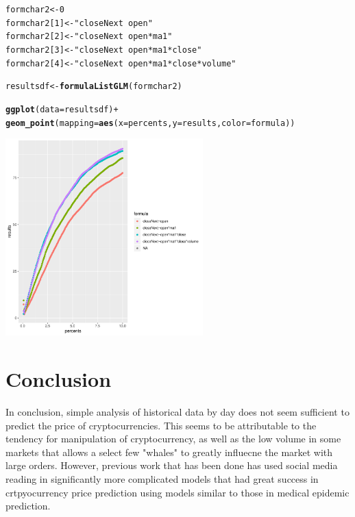 \documentclass{article}\usepackage[]{graphicx}\usepackage[]{color}
\makeatletter
\newcommand{\hlnum}[1]{\textcolor[rgb]{0.686,0.059,0.569}{#1}}%
\newcommand{\hlstr}[1]{\textcolor[rgb]{0.192,0.494,0.8}{#1}}%
\newcommand{\hlopt}[1]{\textcolor[rgb]{0,0,0}{#1}}%
\newcommand{\hlstd}[1]{\textcolor[rgb]{0.345,0.345,0.345}{#1}}%
\newcommand{\hlkwb}[1]{\textcolor[rgb]{0.69,0.353,0.396}{#1}}%
\newcommand{\hlkwc}[1]{\textcolor[rgb]{0.333,0.667,0.333}{#1}}%
\newcommand{\hlkwd}[1]{\textcolor[rgb]{0.737,0.353,0.396}{\textbf{#1}}}%
\newenvironment{kframe}{%
 \def\at@end@of@kframe{}%
 \ifinner\ifhmode%
  \def\at@end@of@kframe{\end{minipage}}%
  \begin{minipage}{\columnwidth}%
 \fi\fi%
 \def\FrameCommand##1{\hskip\@totalleftmargin \hskip-\fboxsep
 \colorbox{shadecolor}{##1}\hskip-\fboxsep
     \hskip-\linewidth \hskip-\@totalleftmargin \hskip\columnwidth}%
 \MakeFramed {\advance\hsize-\width
   \@totalleftmargin\z@ \linewidth\hsize
   \@setminipage}}%
 {\par\unskip\endMakeFramed%
 \at@end@of@kframe}
\newenvironment{knitrout}{}{} %
\makeatother
\begin{document}
\begin{knitrout}
\color{fgcolor}\begin{kframe}
\begin{alltt}
  \hlstd{formchar2}    \hlkwb{<-} \hlnum{0}
  \hlstd{formchar2[}\hlnum{1}\hlstd{]} \hlkwb{<-} \hlstr{"closeNext~open"}
  \hlstd{formchar2[}\hlnum{2}\hlstd{]} \hlkwb{<-} \hlstr{"closeNext~open*ma1"}
  \hlstd{formchar2[}\hlnum{3}\hlstd{]} \hlkwb{<-} \hlstr{"closeNext~open*ma1*close"}
  \hlstd{formchar2[}\hlnum{4}\hlstd{]} \hlkwb{<-} \hlstr{"closeNext~open*ma1*close*volume"}

  \hlstd{resultsdf} \hlkwb{<-} \hlkwd{formulaListGLM}\hlstd{(formchar2)}
\end{alltt}
\end{kframe}
\end{knitrout}

\begin{center}
\begin{knitrout}
\color{fgcolor}\begin{kframe}
\begin{alltt}
\hlkwd{ggplot}\hlstd{(}\hlkwc{data}\hlstd{=resultsdf)} \hlopt{+}
  \hlkwd{geom_point}\hlstd{(}\hlkwc{mapping} \hlstd{=} \hlkwd{aes}\hlstd{(}\hlkwc{x}\hlstd{=percents,}\hlkwc{y}\hlstd{=results,}\hlkwc{color}\hlstd{=formula))}
\end{alltt}
\end{kframe}
\includegraphics[width=3in,height=3in]{figure/unnamed-chunk-19-1} 

\end{knitrout}
\end{center}

\section{Conclusion}
In conclusion, simple analysis of historical data by day does not seem sufficient to predict the price of cryptocurrencies. This seems to be attributable to the tendency for manipulation of cryptocurrency, as well as the low volume in some markets that allows a select few "whales" to greatly influecne the market with large orders.\cite{liu2018risks} However, previous work that has been done has used social media reading in significantly more complicated models that had great success in crtpyocurrency price prediction using models similar to those in medical epidemic prediction.\cite{phillips2017predicting}\cite{kim2016predicting}




\end{document}
